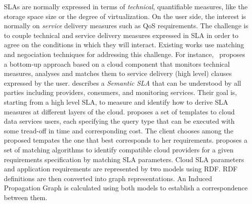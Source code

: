 


SLAs are normally expressed in terms of \textit{technical}, quantifiable measures, like the storage space size  or the degree of virtualization. 
On the user side, the interest is normally on \textit{service} delivery measures such as QoS requirements.
The challenge is to couple technical and service delivery measures expressed in SLA in order to agree on the conditions in which they will interact. Existing works use matching and negociation techniques for addressing this challenge.  
For instance,~\cite{5547150} 
proposes a bottom-up approach based on a cloud component that monitors technical measures, analyses and matches them to service delivery (high level) clauses expressed by the user.
  \cite{Dastjerdi:2012:DOA:2275356.2275360} describes a \textit{Semantic SLA} that can be understood by all parties including providers, consumers, and monitoring services.
Their goal is, starting from a high level SLA, to measure and identify how to derive SLA measures  at different layers of the cloud.  \cite{Ortiz:2013:VPS:2486767.2486772}
  proposes a set of templates to  cloud data services users, each specifying the query type that can be executed with some tread-off in time and corresponding cost.  The client  chooses among the proposed tempates the one that best corresponds   to her requirements. \cite{6141307} proposes a set of matching algorithms to identify compatible cloud providers for a given requirements specification by matching SLA parameters. Cloud SLA parameters and application requirements are represented by two models using RDF. RDF definitions are then converted into graph representations. An Induced Propagation Graph is calculated using both models to establish a correspondence between them.


